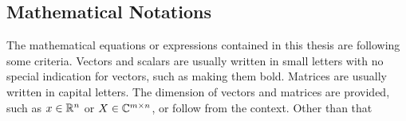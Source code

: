 

\subsection{Mathematical Notations}\label{sec:intro_overview_math}
The mathematical equations or expressions contained in this thesis are following some criteria.
Vectors and scalars are usually written in small letters with no special indication for vectors, such as making them bold.
Matrices are usually written in capital letters.
The dimension of vectors and matrices are provided, such as $x\in\mathbb{R}^n$ or $X\in\mathbb{C}^{m \times n}$, or follow from the context.
Other than that